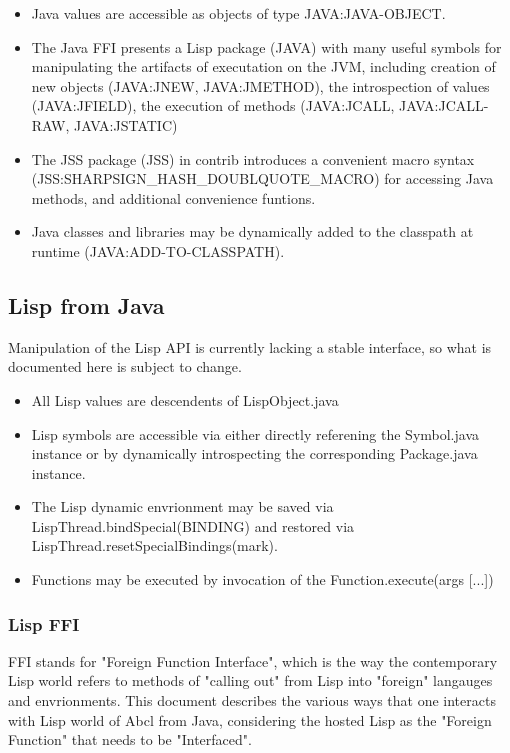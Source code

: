 \documentclass[10pt]{article}
\begin{document}
\begin{itemize}
\item Java values are accessible as objects of type JAVA:JAVA-OBJECT.
\item The Java FFI presents a Lisp package (JAVA) with many useful
  symbols for manipulating the artifacts of executation on the JVM,
  including creation of new objects (JAVA:JNEW, JAVA:JMETHOD), the
  introspection of values (JAVA:JFIELD), the execution of methods
  (JAVA:JCALL, JAVA:JCALL-RAW, JAVA:JSTATIC)
\item The JSS package (JSS) in contrib introduces a convenient macro
  syntax (JSS:SHARPSIGN_HASH_DOUBLQUOTE_MACRO) for accessing Java
  methods, and additional convenience funtions.
\item Java classes and libraries may be dynamically added to the
  classpath at runtime (JAVA:ADD-TO-CLASSPATH).
\end{itemize}

\subsection{Lisp from Java}

Manipulation of the Lisp API is currently lacking a stable interface,
so what is documented here is subject to change.  

\begin{itemize}
\item All Lisp values are descendents of LispObject.java
\item Lisp symbols are accessible via either directly referening the
  Symbol.java instance or by dynamically introspecting the
  corresponding Package.java instance.
\item The Lisp dynamic envrionment may be saved via
  LispThread.bindSpecial(BINDING) and restored via
  LispThread.resetSpecialBindings(mark).
\item Functions may be executed by invocation of the
  Function.execute(args [...]) 
\end{itemize}

\subsubsection{Lisp FFI}

FFI stands for "Foreign Function Interface", which is the way the
contemporary Lisp world refers to methods of "calling out" from Lisp
into "foreign" langauges and envrionments.  This document describes
the various ways that one interacts with Lisp world of Abcl from Java,
considering the hosted Lisp as the "Foreign Function" that needs to be
"Interfaced".
\end{document}
